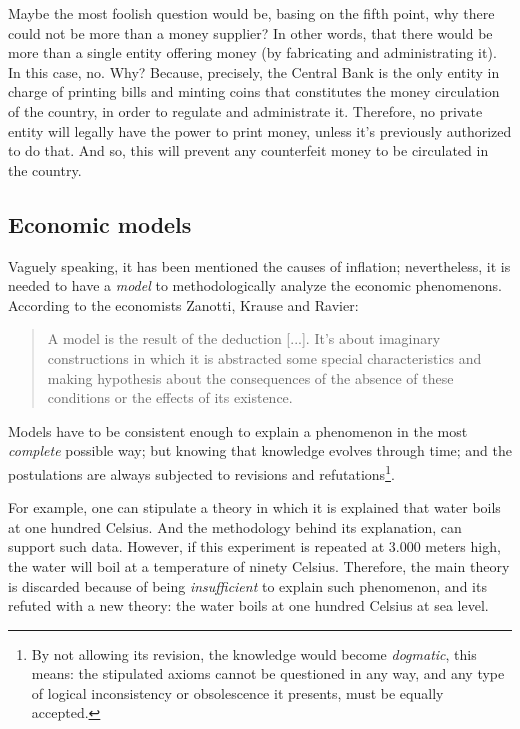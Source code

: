 \documentclass[12pt,a4paper,twoside]{book}
\begin{document}
Maybe the most foolish question would be, basing on the fifth point, why there could not be more than a money supplier? In other words, that there would be more than a single entity offering money (by fabricating and administrating it). In this case, no. Why? Because, precisely, the Central Bank is the only entity in charge of printing bills and minting coins that constitutes the money circulation of the country, in order to regulate and administrate it. Therefore, no private entity will legally have the power to print money, unless it's previously authorized to do that. And so, this will prevent any counterfeit money to be circulated in the country.

\subsection{Economic models}
Vaguely speaking, it has been mentioned the causes of inflation; nevertheless, it is needed to have a \textit{model} to methodologically analyze the economic phenomenons. According to the economists Zanotti, Krause and Ravier:

\begin{quotation}
A model is the result of the deduction [...]. It's about imaginary constructions in which it is abstracted some special characteristics and making hypothesis about the consequences of the absence of these conditions or the effects of its existence. \cite[p. 25]{elementos-econopol}
\end{quotation}

Models have to be consistent enough to explain a phenomenon in the most \textit{complete} possible way; but knowing that knowledge evolves through time; and the postulations are always subjected to revisions and refutations\footnote{By not allowing its revision, the knowledge would become \textit{dogmatic}, this means: the stipulated axioms cannot be questioned in any way, and any type of logical inconsistency or obsolescence it presents, must be equally accepted.}.

For example, one can stipulate a theory in which it is explained that water boils at one hundred Celsius. And the methodology behind its explanation, can support such data. However, if this experiment is repeated at 3.000 meters high, the water will boil at a temperature of ninety Celsius. Therefore, the main theory is discarded because of being \textit{insufficient} to explain such phenomenon, and its refuted with a new theory: the water boils at one hundred Celsius at sea level.
\end{document}
